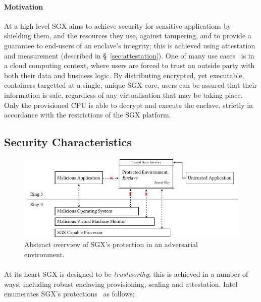 \paragraph{Motivation} At a high-level SGX aims to achieve security for sensitive applications by shielding them, and the resources they use, against tampering, and to provide a guarantee to end-users of an enclave's integrity; this is achieved using attestation and measurement (described in §~\ref{sec:attestation}). One of many use cases~\cite{10.1145/2834050.2834100, 10.1145/2799647, 10.1145/2810103.2813695} is in a cloud computing context, where users are forced to trust an outside party with both their data and business logic. By distributing encrypted, yet executable, containers targetted at a single, unique SGX core, users can be assured that their information is safe, regardless of any virtualisation that may be taking place. Only the provisioned CPU is able to decrypt and execute the enclave, strictly in accordance with the restrictions of the SGX platform.

\subsection{Security Characteristics}

\begin{figure}[]
    \centering
    \includegraphics[width=0.95\linewidth]{figures/SGX-architecture.pdf}
    \caption{Abstract overview of SGX's protection in an adversarial environment.}
    \label{fig:sgx-basic}
\end{figure}

\paragraph{} At its heart SGX is designed to be \textit{trustworthy}; this is achieved in a number of ways, including robust enclaving provisioning, sealing and attestation. Intel enumerates SGX's protections~\cite{10.1145/2487726.2488368,sgx-eval-sdk} as follows;

